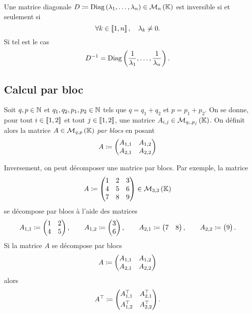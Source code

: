 \documentclass{magnolia}
\begin{document}
\begin{proposition}[utile=-3]
Une matrice diagonale $D\coloneqq\mathop{\rm{Diag}}\left(\lambda_1,\ldots,\lambda_n\right)\in\mathcal{M}_{n}\left(\mathbb{K}\right)$ est
  inversible si et seulement si
  \[\forall k\in\left\llbracket 1,n\right\rrbracket ,\quad \lambda_k\neq 0.\]
  Si tel est le cas
  \[D^{-1}=\mathop{\rm{Diag}}\left(\frac{1}{\lambda_1},\ldots,\frac{1}{\lambda_n}\right).\]
\end{proposition}



\subsection{Calcul par bloc}

\begin{definition}
Soit $q,p\in\mathbb{N}$ et $q_1,q_2,p_1,p_2\in\mathbb{N}$ tels que $q=q_1+q_2$ et $p=p_1+p_2$. On se donne,
pour tout $i\in\left\llbracket 1,2\right\rrbracket$ et tout $j\in\left\llbracket 1,2\right\rrbracket$, une matrice
$A_{i,j}\in\mathcal{M}_{q_i,p_j}\left(\mathbb{K}\right)$. On définit alors la matrice $A\in\mathcal{M}_{q,p}\left(\mathbb{K}\right)$ \emph{par blocs}
en posant
\[A\coloneqq
  \begin{pmatrix}
  A_{1,1} & A_{1,2}\\
  A_{2,1} & A_{2,2}
  \end{pmatrix}\]
\end{definition}

\begin{remarques}
\remarque Inversement, on peut décomposer une matrice par blocs. Par exemple, la matrice
\[A\coloneqq\begin{pmatrix}
  1 & 2 & 3\\
  4 & 5 & 6\\
  7 & 8 & 9
\end{pmatrix}\in\mathcal{M}_{3,3}\left(\mathbb{K}\right)\]
se décompose par blocs à l'aide des matrices
\[A_{1,1}\coloneqq\begin{pmatrix}
  1 & 2\\
  4 & 5\end{pmatrix}, \qquad
  A_{1,2}\coloneqq\begin{pmatrix}
  3\\
  6\end{pmatrix}, \qquad
  A_{2,1}\coloneqq\begin{pmatrix}
  7 & 8
  \end{pmatrix}, \qquad
  A_{2,2}\coloneqq\begin{pmatrix}
  9
  \end{pmatrix}.\]
  \remarque Si la matrice $A$ se décompose par blocs
  \[A\coloneqq
    \begin{pmatrix}
    A_{1,1} & A_{1,2}\\
    A_{2,1} & A_{2,2}
    \end{pmatrix}\]
    alors
    \[\trans{A}\defeq
    \begin{pmatrix}
    A_{1,1}^\top  
     & A_{2,1}^\top\\
    A_{1,2}^\top \setbox0=\hbox{}\ht0=12pt\dp0=0pt\wd0=0pt\lower0pt\box0 & A_{2,2}^\top
    \end{pmatrix}.\] 
  \end{remarques}
\end{document}
